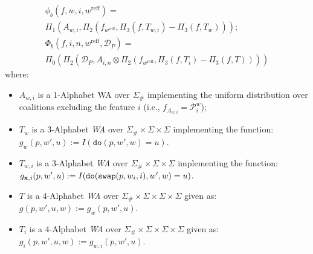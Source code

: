 \begin{lemma}
{\begin{align*}
            \phi_b(f,w,i,w^{\text{reff}}) = \quad\quad\quad\quad\quad\quad\quad\quad\quad\quad\quad\quad\quad\quad\quad\quad \\ \Pi_{1} (A_{w,i}, \Pi_{2}(f_{w^{\text{reff}}}, \Pi_{3}(f,T_{w,i}) 
          - \Pi_{3}(f,T_{w})));\quad \\
            \Phi_b(f,i,n,w^{\text{reff}},\mathcal{D}_P) = \quad\quad\quad\quad\quad\quad\quad\quad\quad\quad\quad\quad\quad\quad \\ \Pi_{0} ( \Pi_{2}(\mathcal{D}_P, A_{i,n} \otimes \Pi_{2}(f_{w^{\text{reff}}} ,
            \Pi_{3}(f,T_{i}) - \Pi_{3}(f,T)) ))
               \end{align*}
             } where:
    \begin{itemize}
        \item $A_{w,i}$ is a 1-Alphabet WA over $\Sigma_{\#}$ implementing the uniform distribution over coalitions excluding the feature $i$ (i.e., $f_{A_{w,i}} = \mathcal{P}_{i}^{w}$);
        \item $T_{w}$ is a 3-Alphabet \emph{WA} over $\Sigma_{\#} \times \Sigma \times \Sigma$ implementing the function: $ g_{w}(p,w',u) := I(\texttt{do}(p,w',w) = u)$.
        \item $T_{w,i}$ is a 3-Alphabet \emph{WA} over $\Sigma_{\#} \times \Sigma \times \Sigma$ implementing the function: $            g_{\textbf{x},i}(p,w',u) := I(\texttt{do}(\texttt{swap}(p,w_{i},i),w',w) = u)$.
        \item $T$ is a 4-Alphabet \emph{WA} over $\Sigma_{\#} \times \Sigma \times \Sigma \times \Sigma$ given as: $g(p,w',u,w) := g_{w}(p,w',u)$.
        \item $T_{i}$ is a 4-Alphabet \emph{WA} over $\Sigma_{\#} \times \Sigma \times \Sigma \times \Sigma$ given as: $ g_{i}(p,w',u,w) := g_{w,i}(p,w',u)$.

\end{itemize}
\end{lemma}
